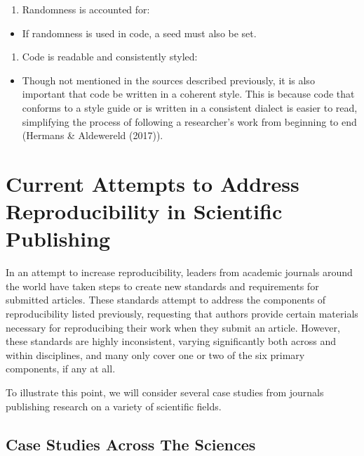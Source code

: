 \documentclass[12pt,twoside]{reedthesis}
\providecommand{\tightlist}{%
  \setlength{\itemsep}{0pt}\setlength{\parskip}{0pt}}
\begin{document}
\begin{enumerate}
\def\labelenumi{\arabic{enumi}.}
\setcounter{enumi}{4}
\tightlist
\item
  Randomness is accounted for:
\end{enumerate}
\begin{itemize}
\tightlist
\item
  If randomness is used in code, a seed must also be set.
\end{itemize}
\begin{enumerate}
\def\labelenumi{\arabic{enumi}.}
\setcounter{enumi}{5}
\tightlist
\item
  Code is readable and consistently styled:
\end{enumerate}
\begin{itemize}
\tightlist
\item
  Though not mentioned in the sources described previously, it is also important that code be written in a coherent style. This is because code that conforms to a style guide or is written in a consistent dialect is easier to read, simplifying the process of following a researcher's work from beginning to end (Hermans \& Aldewereld (2017)).
\end{itemize}
\hypertarget{current-attempts-to-address-reproducibility-in-scientific-publishing}{%
\section{Current Attempts to Address Reproducibility in Scientific Publishing}\label{current-attempts-to-address-reproducibility-in-scientific-publishing}}

In an attempt to increase reproducibility, leaders from academic journals around the world have taken steps to create new standards and requirements for submitted articles. These standards attempt to address the components of reproducibility listed previously, requesting that authors provide certain materials necessary for reproducibing their work when they submit an article. However, these standards are highly inconsistent, varying significantly both across and within disciplines, and many only cover one or two of the six primary components, if any at all.

To illustrate this point, we will consider several case studies from journals publishing research on a variety of scientific fields.

\hypertarget{case-studies-across-the-sciences}{%
\subsection{Case Studies Across The Sciences}\label{case-studies-across-the-sciences}}
\end{document}
